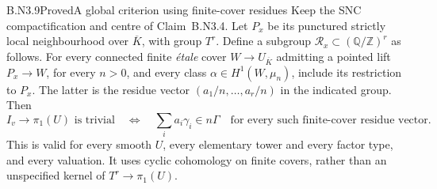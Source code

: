 \begin{claim}{B.N3.9}{Proved}{A global criterion using finite-cover residues}
Keep the SNC compactification and centre of Claim~B.N3.4.  Let
$P_x$ be its punctured strictly local neighbourhood over
$\overline K$, with group $T^r$.  Define a subgroup
$\mathcal R_x\subset(\mathbb Q/\mathbb Z)^r$ as follows.
For every connected finite \emph{\'etale} cover
$W\to U_{\overline K}$ admitting a pointed lift
$P_x\to W$, for every $n>0$, and every class
$\alpha\in H^1(W,\mu_n)$, include its restriction to $P_x$.
The latter is the residue vector
$(a_1/n,\ldots,a_r/n)$ in the indicated group.  Then
\[
 I_v\to\pi_1(U)\text{ is trivial}
 \quad\Longleftrightarrow\quad
 \sum_i a_i\gamma_i\in n\Gamma
 \quad\text{for every such finite-cover residue vector}.
\]
This is valid for every smooth $U$, every elementary tower and every
factor type, and every valuation.  It uses cyclic cohomology on
finite covers, rather than an unspecified kernel of
$T^r\to\pi_1(U)$.
\end{claim}
